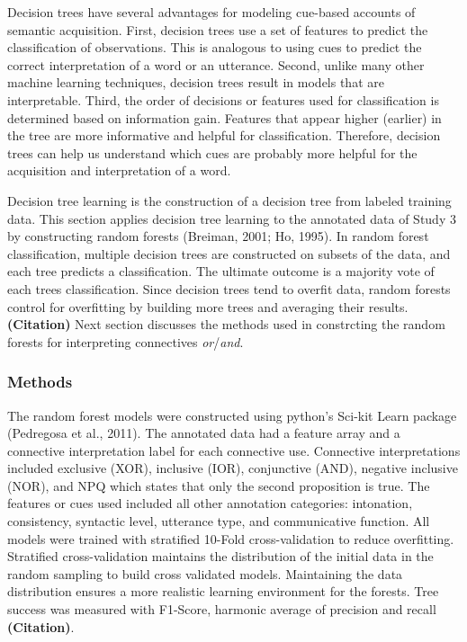 \documentclass[floatsintext,man]{apa6}
\theoremstyle{definition}
\theoremstyle{definition}
\theoremstyle{definition}
\theoremstyle{remark}
\begin{document}
Decision trees have several advantages for modeling cue-based accounts
of semantic acquisition. First, decision trees use a set of features to
predict the classification of observations. This is analogous to using
cues to predict the correct interpretation of a word or an utterance.
Second, unlike many other machine learning techniques, decision trees
result in models that are interpretable. Third, the order of decisions
or features used for classification is determined based on information
gain. Features that appear higher (earlier) in the tree are more
informative and helpful for classification. Therefore, decision trees
can help us understand which cues are probably more helpful for the
acquisition and interpretation of a word.

Decision tree learning is the construction of a decision tree from
labeled training data. This section applies decision tree learning to
the annotated data of Study 3 by constructing random forests (Breiman,
2001; Ho, 1995). In random forest classification, multiple decision
trees are constructed on subsets of the data, and each tree predicts a
classification. The ultimate outcome is a majority vote of each trees
classification. Since decision trees tend to overfit data, random
forests control for overfitting by building more trees and averaging
their results. \textbf{(Citation)} Next section discusses the methods
used in constrcting the random forests for interpreting connectives
\emph{or}/\emph{and}.

\subsubsection{Methods}\label{methods-2}

The random forest models were constructed using python's Sci-kit Learn
package (Pedregosa et al., 2011). The annotated data had a feature array
and a connective interpretation label for each connective use.
Connective interpretations included exclusive (XOR), inclusive (IOR),
conjunctive (AND), negative inclusive (NOR), and NPQ which states that
only the second proposition is true. The features or cues used included
all other annotation categories: intonation, consistency, syntactic
level, utterance type, and communicative function. All models were
trained with stratified 10-Fold cross-validation to reduce overfitting.
Stratified cross-validation maintains the distribution of the initial
data in the random sampling to build cross validated models. Maintaining
the data distribution ensures a more realistic learning environment for
the forests. Tree success was measured with F1-Score, harmonic average
of precision and recall \textbf{(Citation)}.
\end{document}
